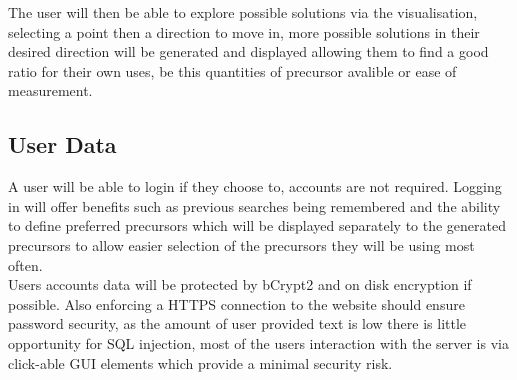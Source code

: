 The user will then be able to explore possible solutions via the visualisation, selecting a point then a direction to move in, more possible solutions in their desired direction will be generated and displayed allowing them to find a good ratio for their own uses, be this quantities of precursor avalible or ease of measurement.

\subsection{User Data}
A user will be able to login if they choose to, accounts are not required. Logging in will offer benefits such as previous searches being remembered and the ability to define preferred precursors which will be displayed separately to the generated precursors to allow easier selection of the precursors they will be using most often.\\

Users accounts data will be protected by bCrypt2 and on disk encryption if possible. Also enforcing a HTTPS connection to the website should ensure password security, as the amount of user provided text is low there is little opportunity for SQL injection, most of the users interaction with the server is via click-able GUI elements which provide a minimal security risk.
